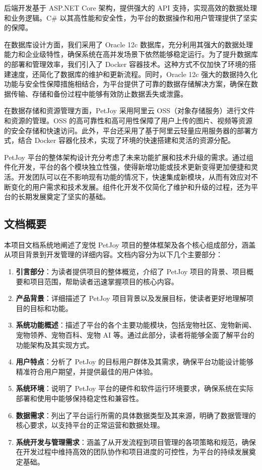 后端开发基于 ASP.NET Core 架构，提供强大的 API 支持，实现高效的数据处理和业务逻辑。C\# 以其高性能和安全性，为平台的数据操作和用户管理提供了坚实的保障。

在数据库设计方面，我们采用了 Oracle 12c 数据库，充分利用其强大的数据处理能力和企业级特性，确保系统在高并发场景下依然能够稳定运行。为了提升数据库的部署和管理效率，我们引入了 Docker 容器技术。这种方式不仅加快了环境的搭建速度，还简化了数据库的维护和更新流程。同时，Oracle 12c 强大的数据持久化功能与安全性保障措施相结合，为平台提供了可靠的数据存储解决方案，确保在数据传输、存储和备份过程中能够有效防止数据丢失或泄露。

在数据存储和资源管理方面，PetJoy 采用阿里云 OSS（对象存储服务）进行文件和资源的管理。OSS 的高可靠性和高可用性保障了用户上传的图片、视频等资源的安全存储和快速访问。此外，平台还采用了基于阿里云轻量应用服务器的部署方式，结合 Docker 容器化技术，实现了环境的快速搭建和灵活的资源分配。

PetJoy 平台的整体架构设计充分考虑了未来功能扩展和技术升级的需求。通过组件化开发，平台的各个模块独立性强，使得新增功能或技术更新变得更加便捷和灵活。开发团队可以在不影响现有功能的情况下，快速集成新模块，从而有效应对不断变化的用户需求和技术发展。组件化开发不仅简化了维护和升级的过程，还为平台的长期发展奠定了坚实的基础。

\subsection{文档概要}
本项目文档系统地阐述了宠悦 PetJoy 项目的整体框架及各个核心组成部分，涵盖从项目背景到开发管理的详细内容。文档内容分为以下几个主要部分：

\begin{enumerate}
	\item \textbf{引言部分}：为读者提供项目的整体概览，介绍了 PetJoy 项目的背景、项目概要和项目范围，帮助读者迅速掌握项目的核心内容。
	\item \textbf{产品背景}：详细描述了 PetJoy 项目背景以及发展目标，使读者更好地理解项目的目标和功能。
	\item \textbf{系统功能概述}：描述了平台的各个主要功能模块，包括宠物社区、宠物新闻、宠物领养、宠物百科、宠物 AI 等。通过此部分，读者将能够全面了解平台的功能架构及其实现方式。
	\item \textbf{用户特点}：分析了 PetJoy 的目标用户群体及其需求，确保平台功能设计能够精准符合用户期望，并提供最佳的用户体验。
	\item \textbf{系统环境}：说明了 PetJoy 平台的硬件和软件运行环境要求，确保系统在实际部署和使用中能够保持稳定性和兼容性。
	\item \textbf{数据需求}：列出了平台运行所需的具体数据类型及其来源，明确了数据管理的核心要求，以支持平台的正常运营和数据处理。
	\item \textbf{系统开发与管理需求}：涵盖了从开发流程到项目管理的各项策略和规范，确保在开发过程中维持高效的团队协作和项目进度的可控性，为平台的持续发展奠定基础。
\end{enumerate}


